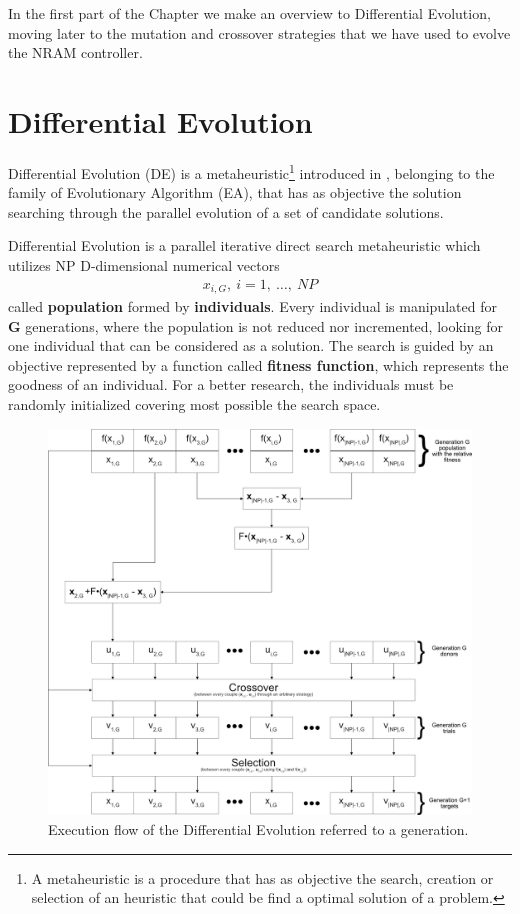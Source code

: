 \label{chap:differential-evolution}
In the first part of the Chapter we make an overview to Differential Evolution, moving later to the mutation and crossover strategies that we have used to evolve the NRAM controller.

\section{Differential Evolution}
Differential Evolution (DE) is a metaheuristic\footnote{A metaheuristic is a procedure that has as objective the search, creation or selection of an heuristic that could be find a optimal solution of a problem.} introduced in \cite{DESEHGOCS:1997}, belonging to the family of Evolutionary Algorithm (EA), that has as objective the solution searching through the parallel evolution of a set of candidate solutions. 

Differential Evolution is a parallel iterative direct search metaheuristic which utilizes NP D-dimensional numerical vectors 
\begin{align}
	x_{i, G},\ i=1,\ \dots,\ NP 
\end{align}
called \textbf{population} formed by \textbf{individuals}. Every individual is manipulated for \textbf{G} generations, where the population is not reduced nor incremented, looking for one individual that can be considered as a solution. The search is guided by an objective represented by a function called \textbf{fitness function}, which represents the goodness of an individual. For a better research, the individuals must be randomly initialized covering most possible the search space.

\begin{figure}[h]
	\centering
	\includegraphics[width=\textwidth]{figures/de-flow-complete.png}
	\caption{Execution flow of the Differential Evolution referred to a generation.}
	\label{fig:bin-crossover}
\end{figure}

